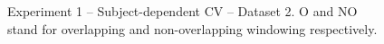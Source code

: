 \documentclass[sensors,article,submit,moreauthors,pdftex]{Definitions/mdpi}
\begin{document}
\begin{figure}[htp]
   
   \caption{Experiment 1 -- Subject-dependent CV -- Dataset 2. O and NO stand for overlapping and non-overlapping windowing respectively.}
    \label{fig:exp1_ds2}
    
\end{figure}
\end{document}
